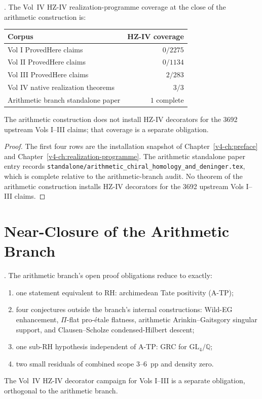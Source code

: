 \begin{proposition}
\label{v4-arith:w10-final:prop:hziv-separate}
\ClaimStatusProvedHere. The Vol~IV HZ-IV realization-programme coverage
at the close of the arithmetic construction is:
\begin{center}
\begin{tabular}{lr}
\toprule
\textbf{Corpus} & \textbf{HZ-IV coverage}\\
\midrule
Vol I ProvedHere claims & \(0/2275\)\\
Vol II ProvedHere claims & \(0/1134\)\\
Vol III ProvedHere claims & \(2/283\)\\
Vol IV native realization theorems & \(3/3\)\\
Arithmetic branch standalone paper & \(1\) complete\\
\bottomrule
\end{tabular}
\end{center}
The arithmetic construction does not install HZ-IV decorators for
the 3692 upstream Vols I--III claims; that coverage is a separate
obligation.
\end{proposition}

\begin{proof}
The first four rows are the installation snapshot of
Chapter~\ref{v4-ch:preface} and
Chapter~\ref{v4-ch:realization-programme}. The arithmetic standalone
paper entry records
\texttt{standalone/arithmetic\_chiral\_homology\_and\_deninger.tex},
which is complete relative to the arithmetic-branch audit. No theorem
of the arithmetic construction installs HZ-IV decorators for the
3692 upstream Vols I--III claims.
\end{proof}

\section{Near-Closure of the Arithmetic Branch}
\label{v4-arith:w10-final:assessment}

\begin{theorem}
\label{v4-arith:w10-final:thm:near-closure}
\ClaimStatusProvedHere. The arithmetic branch's open proof obligations
reduce to exactly:
\begin{enumerate}
\item one statement equivalent to RH: archimedean Tate positivity (A-TP);
\item four conjectures outside the branch's internal constructions:
Wild-EG enhancement, \(\Pi\)-flat pro-\'etale flatness, arithmetic
Arinkin--Gaitsgory singular support, and Clausen--Scholze
condensed-Hilbert descent;
\item one sub-RH hypothesis independent of A-TP: GRC for
\(\mathrm{GL}_{4}/\mathbb{Q}\);
\item two small residuals of combined scope \(3\)--\(6\)~pp and density
zero.
\end{enumerate}
The Vol~IV HZ-IV decorator campaign for Vols I--III is a separate
obligation, orthogonal to the arithmetic branch.
\end{theorem}

